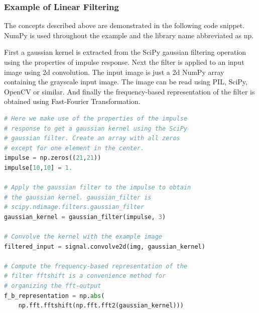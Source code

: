 \documentclass[]{article}
\begin{document}
\subsubsection{Example of Linear Filtering}
\label{example-of-linear-filtering}
The concepts described above are demonstrated in the following code snippet.
NumPy is used throughout the example and the library name abbreviated as np.

First a gaussian kernel is extracted from the SciPy gaussian filtering operation
using the properties of impulse response. Next the filter is applied to an input
image using 2d convolution. The input image is just a 2d NumPy array containing
the grayscale input image. The image can be read using PIL, SciPy, OpenCV or
similar. And finally the frequency-based representation of the filter is
obtained using Fast-Fourier Transformation.

\begin{minipage}{\linewidth}
\begin{lstlisting}[language=Python]
# Here we make use of the properties of the impulse
# response to get a gaussian kernel using the SciPy
# gaussian filter. Create an array with all zeros
# except for one element in the center.
impulse = np.zeros((21,21))
impulse[10,10] = 1.

# Apply the gaussian filter to the impulse to obtain
# the gaussian kernel. gaussian_filter is
# scipy.ndimage.filters.gaussian_filter
gaussian_kernel = gaussian_filter(impulse, 3)

# Convolve the kernel with the example image
filtered_input = signal.convolve2d(img, gaussian_kernel)

# Compute the frequency-based representation of the
# filter fftshift is a convenience method for
# organizing the fft-output
f_b_representation = np.abs(
    np.fft.fftshift(np.fft.fft2(gaussian_kernel)))
\end{lstlisting}
\end{minipage}
\end{document}
